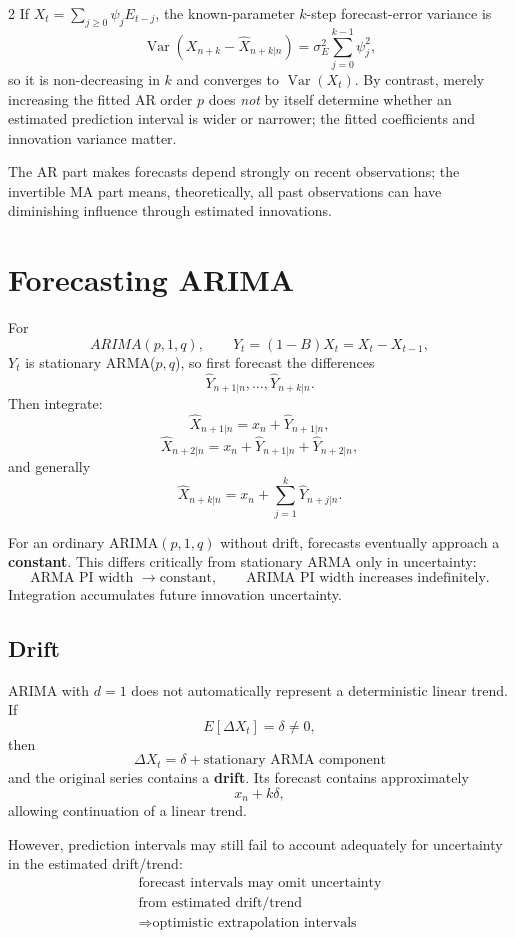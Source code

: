 \documentclass[9pt,a4paper]{extarticle}
\newcommand{\key}[1]{\textbf{#1}}
\begin{document}
\begin{multicols}{2}
If \(X_t=\sum_{j\ge0}\psi_jE_{t-j}\), the known-parameter \(k\)-step forecast-error variance is
\[
\boxed{\operatorname{Var}(X_{n+k}-\widehat X_{n+k|n})
=\sigma_E^2\sum_{j=0}^{k-1}\psi_j^2},
\]
so it is non-decreasing in \(k\) and converges to \(\operatorname{Var}(X_t)\). By contrast, merely increasing the fitted AR order \(p\) does \emph{not} by itself determine whether an estimated prediction interval is wider or narrower; the fitted coefficients and innovation variance matter.

The AR part makes forecasts depend strongly on recent observations; the invertible MA part means, theoretically, all past observations can have diminishing influence through estimated innovations.

\section{Forecasting ARIMA}

For
\[
ARIMA(p,1,q),
\qquad
Y_t=(1-B)X_t=X_t-X_{t-1},
\]
\(Y_t\) is stationary ARMA($p,q$), so first forecast the differences
\[
\widehat Y_{n+1|n},\ldots,\widehat Y_{n+k|n}.
\]
Then integrate:
\[
\widehat X_{n+1|n}
=x_n+\widehat Y_{n+1|n},
\]
\[
\widehat X_{n+2|n}
=x_n+\widehat Y_{n+1|n}
+\widehat Y_{n+2|n},
\]
and generally
\[
\boxed{
\widehat X_{n+k|n}
=
x_n+
\sum_{j=1}^{k}\widehat Y_{n+j|n}.
}
\]

For an ordinary ARIMA\((p,1,q)\) without drift, forecasts eventually approach a \key{constant}. This differs critically from stationary ARMA only in uncertainty:
\[
\boxed{\text{ARMA PI width }\to\text{constant},\qquad
\text{ARIMA PI width increases indefinitely}.}
\]
Integration accumulates future innovation uncertainty.

\subsection{Drift}

ARIMA with \(d=1\) does not automatically represent a deterministic linear trend. If
\[
E[\Delta X_t]=\delta\neq0,
\]
then
\[
\boxed{\Delta X_t=\delta+\text{stationary ARMA component}}
\]
and the original series contains a \key{drift}. Its forecast contains approximately
\[
x_n+k\delta,
\]
allowing continuation of a linear trend.

However, prediction intervals may still fail to account adequately for uncertainty in the estimated drift/trend:
\[
\boxed{\begin{array}{c}
\text{forecast intervals may omit uncertainty}\\
\text{from estimated drift/trend}\\
\Rightarrow\text{optimistic extrapolation intervals}
\end{array}}
\]


\end{multicols}
\end{document}
